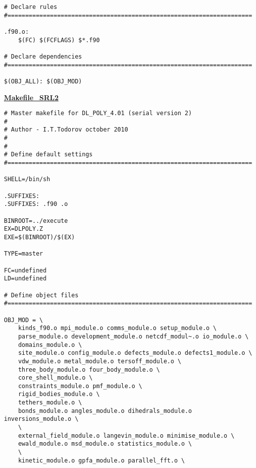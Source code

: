 \begin{verbatim}
# Declare rules
#=====================================================================

.f90.o:
	$(FC) $(FCFLAGS) $*.f90

# Declare dependencies
#=====================================================================

$(OBJ_ALL): $(OBJ_MOD)
\end{verbatim}
\clearpage
{\sc \bf \underline{Makefile\_SRL2}}
\begin{verbatim}
# Master makefile for DL_POLY_4.01 (serial version 2)
#
# Author - I.T.Todorov october 2010
#
#
# Define default settings
#=====================================================================

SHELL=/bin/sh

.SUFFIXES:
.SUFFIXES: .f90 .o

BINROOT=../execute
EX=DLPOLY.Z
EXE=$(BINROOT)/$(EX)

TYPE=master

FC=undefined
LD=undefined

# Define object files
#=====================================================================

OBJ_MOD = \
	kinds_f90.o mpi_module.o comms_module.o setup_module.o \
	parse_module.o development_module.o netcdf_modul~.o io_module.o \
	domains_module.o \
	site_module.o config_module.o defects_module.o defects1_module.o \
	vdw_module.o metal_module.o tersoff_module.o \
	three_body_module.o four_body_module.o \
	core_shell_module.o \
	constraints_module.o pmf_module.o \
	rigid_bodies_module.o \
	tethers_module.o \
	bonds_module.o angles_module.o dihedrals_module.o inversions_module.o \
	\
	external_field_module.o langevin_module.o minimise_module.o \
	ewald_module.o msd_module.o statistics_module.o \
	\
	kinetic_module.o gpfa_module.o parallel_fft.o \


\end{verbatim}
